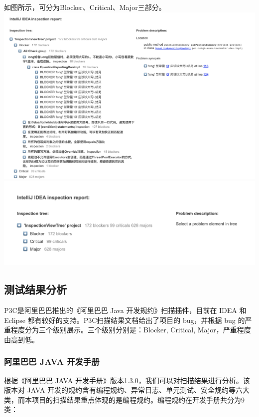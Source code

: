 \documentclass[hyperref, a4paper]{ctexart}
\begin{document}
如图所示，可分为Blocker、Critical、Major三部分。
\includegraphics{screenshots/pic1.jpg}
\includegraphics{screenshots/pic2.jpg}

\hypertarget{ux6d4bux8bd5ux7ed3ux679cux5206ux6790-1}{%
\subsection{测试结果分析}\label{ux6d4bux8bd5ux7ed3ux679cux5206ux6790-1}}

P3C是阿里巴巴推出的《阿里巴巴 Java 开发规约》扫描插件，目前在 IDEA 和
Eclipse 都有较好的支持。P3C扫描结果文档给出了项目的 bug，并根据 bug
的严重程度分为三个级别展示。三个级别分别是：Blocker, Critical,
Major，严重程度由高到低。

\hypertarget{ux963fux91ccux5df4ux5df4-java-ux5f00ux53d1ux624bux518c}{%
\subsubsection{阿里巴巴 JAVA
开发手册}\label{ux963fux91ccux5df4ux5df4-java-ux5f00ux53d1ux624bux518c}}

根据《阿里巴巴 JAVA
开发手册》版本1.3.0，我们可以对扫描结果进行分析。该版本对 JAVA
开发的规约含有编程规约、异常日志、单元测试、安全规约等六大类，而本项目的扫描结果重点体现的是编程规约。编程规约在开发手册共分为9类：
\end{document}

